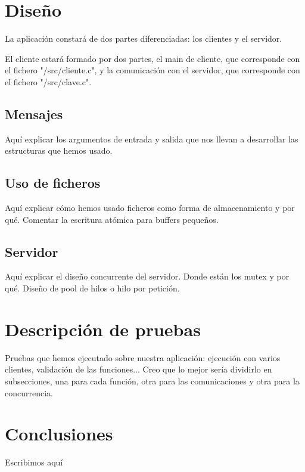 \documentclass[]{article}
\begin{document}
\section{Diseño}
\label{sec:disenno}
La aplicación constará de dos partes diferenciadas: los clientes y el servidor.

El cliente estará formado por dos partes, el main de cliente, que corresponde con el fichero "/src/cliente.c", y la comunicación con el servidor, que corresponde con el fichero "/src/clave.c".
\subsection{Mensajes}
\label{subsec:mensajes}
Aquí explicar los argumentos de entrada y salida que nos llevan a desarrollar las estructuras que hemos usado.


\subsection{Uso de ficheros}
\label{subsec:uso_de_ficheros}
Aquí explicar cómo hemos usado ficheros como forma de almacenamiento y por qué. Comentar la escritura atómica para buffers pequeños. 


\subsection{Servidor}
\label{subsec:servidor}
Aquí explicar el diseño concurrente del servidor. Donde están los mutex y por qué. Diseño de pool de hilos o hilo por petición. 

\section{Descripción de pruebas}
\label{sec:descripcion_de_pruebas}
Pruebas que hemos ejecutado sobre nuestra aplicación: ejecución con varios clientes, validación de las funciones... Creo que lo mejor sería dividirlo en subsecciones, una para cada función, otra para las comunicaciones y otra para la concurrencia. 



\section{Conclusiones}
\label{sec:conclusiones}
Escribimos aquí
\end{document}
